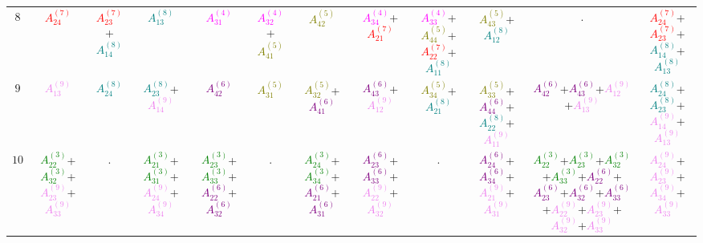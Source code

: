 \documentclass[times,namecite]{goose-article}
\begin{document}
\begin{landscape}
{\begin{tabular}{|c|ccccccccc|cc|}
$8 $& \textcolor{red}{$A_{24}^{(7)}$} & \textcolor{red}{$A_{23}^{(7)}$}+\textcolor{teal}{$A_{14}^{(8)}$} & \textcolor{teal}{$A_{13}^{(8)}$} & \textcolor{magenta}{$A_{31}^{(4)}$} & \textcolor{magenta}{$A_{32}^{(4)}$}+\textcolor{olive}{$A_{41}^{(5)}$} & \textcolor{olive}{$A_{42}^{(5)}$} & \textcolor{magenta}{$A_{34}^{(4)}$}+\textcolor{red}{$A_{21}^{(7)}$} & \textcolor{magenta}{$A_{33}^{(4)}$}+\textcolor{olive}{$A_{44}^{(5)}$}+\textcolor{red}{$A_{22}^{(7)}$}+\textcolor{teal}{$A_{11}^{(8)}$} & \textcolor{olive}{$A_{43}^{(5)}$}+\textcolor{teal}{$A_{12}^{(8)}$} & . & \textcolor{red}{$A_{24}^{(7)}$}+\textcolor{red}{$A_{23}^{(7)}$}+\textcolor{teal}{$A_{14}^{(8)}$}+\textcolor{teal}{$A_{13}^{(8)}$} \\
$9 $& \textcolor{violet}{$A_{13}^{(9)}$} & \textcolor{teal}{$A_{24}^{(8)}$} & \textcolor{teal}{$A_{23}^{(8)}$}+\textcolor{violet}{$A_{14}^{(9)}$} & \textcolor{purple}{$A_{42}^{(6)}$} & \textcolor{olive}{$A_{31}^{(5)}$} & \textcolor{olive}{$A_{32}^{(5)}$}+\textcolor{purple}{$A_{41}^{(6)}$} & \textcolor{purple}{$A_{43}^{(6)}$}+\textcolor{violet}{$A_{12}^{(9)}$} & \textcolor{olive}{$A_{34}^{(5)}$}+\textcolor{teal}{$A_{21}^{(8)}$} & \textcolor{olive}{$A_{33}^{(5)}$}+\textcolor{purple}{$A_{44}^{(6)}$}+\textcolor{teal}{$A_{22}^{(8)}$}+\textcolor{violet}{$A_{11}^{(9)}$} & \textcolor{purple}{$A_{42}^{(6)}$}+\textcolor{purple}{$A_{43}^{(6)}$}+\textcolor{violet}{$A_{12}^{(9)}$}+\textcolor{violet}{$A_{13}^{(9)}$} & \textcolor{teal}{$A_{24}^{(8)}$}+\textcolor{teal}{$A_{23}^{(8)}$}+\textcolor{violet}{$A_{14}^{(9)}$}+\textcolor{violet}{$A_{13}^{(9)}$} \\ \hline
$10 $& \textcolor{green}{$A_{22}^{(3)}$}+\textcolor{green}{$A_{32}^{(3)}$}+\textcolor{violet}{$A_{23}^{(9)}$}+\textcolor{violet}{$A_{33}^{(9)}$} & . & \textcolor{green}{$A_{21}^{(3)}$}+\textcolor{green}{$A_{31}^{(3)}$}+\textcolor{violet}{$A_{24}^{(9)}$}+\textcolor{violet}{$A_{34}^{(9)}$} & \textcolor{green}{$A_{23}^{(3)}$}+\textcolor{green}{$A_{33}^{(3)}$}+\textcolor{purple}{$A_{22}^{(6)}$}+\textcolor{purple}{$A_{32}^{(6)}$} & . & \textcolor{green}{$A_{24}^{(3)}$}+\textcolor{green}{$A_{34}^{(3)}$}+\textcolor{purple}{$A_{21}^{(6)}$}+\textcolor{purple}{$A_{31}^{(6)}$} & \textcolor{purple}{$A_{23}^{(6)}$}+\textcolor{purple}{$A_{33}^{(6)}$}+\textcolor{violet}{$A_{22}^{(9)}$}+\textcolor{violet}{$A_{32}^{(9)}$} & . & \textcolor{purple}{$A_{24}^{(6)}$}+\textcolor{purple}{$A_{34}^{(6)}$}+\textcolor{violet}{$A_{21}^{(9)}$}+\textcolor{violet}{$A_{31}^{(9)}$} & \textcolor{green}{$A_{22}^{(3)}$}+\textcolor{green}{$A_{23}^{(3)}$}+\textcolor{green}{$A_{32}^{(3)}$}+\textcolor{green}{$A_{33}^{(3)}$}+\textcolor{purple}{$A_{22}^{(6)}$}+\textcolor{purple}{$A_{23}^{(6)}$}+\textcolor{purple}{$A_{32}^{(6)}$}+\textcolor{purple}{$A_{33}^{(6)}$}+\textcolor{violet}{$A_{22}^{(9)}$}+\textcolor{violet}{$A_{23}^{(9)}$}+\textcolor{violet}{$A_{32}^{(9)}$}+\textcolor{violet}{$A_{33}^{(9)}$} & \textcolor{violet}{$A_{24}^{(9)}$}+\textcolor{violet}{$A_{23}^{(9)}$}+\textcolor{violet}{$A_{34}^{(9)}$}+\textcolor{violet}{$A_{33}^{(9)}$} \\

\end{tabular}}
\end{landscape}
\end{document}
